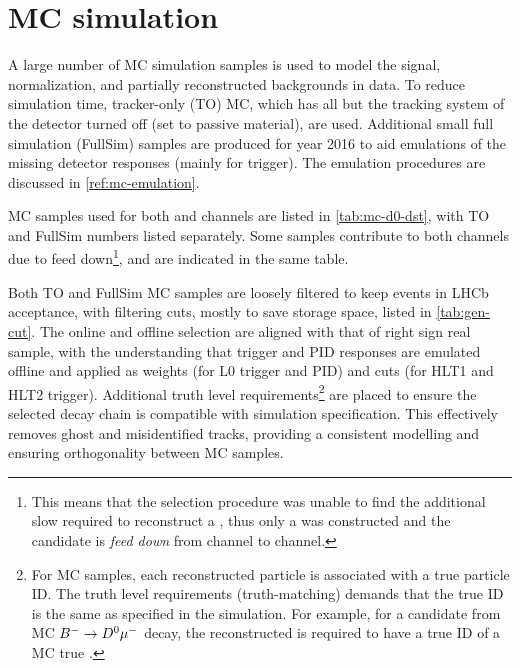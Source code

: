 \section{MC simulation}
\label{ref:sel:mc}

A large number of MC simulation samples is used to
model the signal, normalization, and partially reconstructed backgrounds in
data.
To reduce simulation time, tracker-only (TO) MC, which has all but the tracking
system of the detector turned off (set to passive material), are used.
Additional small full simulation (FullSim) samples are produced for year 2016 to
aid emulations of the missing detector responses (mainly for trigger).
The emulation procedures are discussed in \cref{ref:mc-emulation}.

MC samples used for both \Dz and \Dstar channels are listed in
\cref{tab:mc-d0-dst}, with TO and FullSim numbers listed separately.
Some samples contribute to both channels due to feed down\footnote{
    This means that the selection procedure was unable to find the
    additional slow \pion required to reconstruct a \Dstar, thus only a
    \Dz was constructed and the candidate is \emph{feed down} from \Dstar
    channel to \Dz channel.
}, and are indicated in the same table.

Both TO and FullSim MC samples are loosely filtered to keep events in LHCb
acceptance, with filtering cuts, mostly to save storage space,
listed in \cref{tab:gen-cut}.
The online and offline selection are aligned with that of right sign real \muon
sample,
with the understanding that trigger and PID responses are emulated offline and
applied as weights (for L0 trigger and PID) and cuts
(for HLT1 and HLT2 trigger).
Additional truth level requirements\footnote{
    For MC samples, each reconstructed particle is associated with a true
    particle ID. The truth level requirements (truth-matching) demands that
    the true ID is the same as specified in the simulation.
    For example, for a candidate from  MC ${{{B}^-}} \rightarrow {\ensuremath{{D}^0}}{\ensuremath{\mu^-}}$ decay,
    the reconstructed \muon is required to have a true ID of a MC true \muon.
} are placed to ensure the selected decay
chain is compatible with simulation specification.
This effectively removes ghost and misidentified tracks, providing a consistent
modelling and ensuring orthogonality between MC samples.

